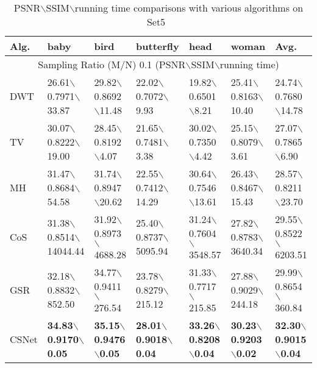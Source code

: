 \documentclass[5pt]{article}
\begin{document}
\begin{table*}[t]\footnotesize
\centering
\caption{\small {PSNR$\backslash$SSIM$\backslash$running time comparisons with various algorithms on Set5~\cite{rf23}}}\label{tab:tab1}
\begin{tabular}{|l|l|l|l|l|l|l|}
\hline 
Alg. & baby & bird & butterfly & head & woman & Avg.\\ 
\hline 
\multicolumn{7}{|c|}{Sampling Ratio (M/N) 0.1 (PSNR$\backslash$SSIM$\backslash$running time)}\\ 
\hline 
DWT & 26.61$\backslash$0.7971$\backslash$33.87 & 29.82$\backslash$0.8692$\backslash$11.48 & 22.02$\backslash$0.7072$\backslash$9.93 & 19.82$\backslash$0.6501$\backslash$8.21 & 25.41$\backslash$0.8163$\backslash$10.40 & 24.74$\backslash$0.7680$\backslash$14.78\\ 
\hline 
TV & 30.07$\backslash$0.8222$\backslash$19.00 & 28.45$\backslash$0.8192$\backslash$4.07 & 21.65$\backslash$0.7481$\backslash$3.38 & 30.02$\backslash$0.7350$\backslash$4.42 & 25.15$\backslash$0.8079$\backslash$3.61 & 27.07$\backslash$0.7865$\backslash$6.90\\ 
\hline 
MH & 31.47$\backslash$0.8684$\backslash$54.58 & 31.74$\backslash$0.8947$\backslash$20.62 & 22.55$\backslash$0.7412$\backslash$14.29 & 30.64$\backslash$0.7546$\backslash$13.61 & 26.43$\backslash$0.8467$\backslash$15.43 & 28.57$\backslash$0.8211$\backslash$23.70\\ 
\hline 
CoS & 31.38$\backslash$0.8514$\backslash$\tiny 14044.44 & 31.92$\backslash$0.8973$\backslash$ \tiny 4688.28 & 25.40$\backslash$0.8737$\backslash$\tiny 5095.94 & 31.24$\backslash$0.7604$\backslash$\tiny 3548.57 & 27.82$\backslash$0.8783$\backslash$\tiny 3640.34 & 29.55$\backslash$0.8522$\backslash$\tiny 6203.51\\ 
\hline 
GSR & 32.18$\backslash$0.8832$\backslash$852.50 & 34.77$\backslash$0.9411$\backslash$276.54 & 23.78$\backslash$0.8279$\backslash$215.12 & 31.33$\backslash$0.7717$\backslash$215.85 & 27.88$\backslash$0.9029$\backslash$244.18 & 29.99$\backslash$0.8654$\backslash$360.84\\ 
\hline 
CSNet & \textbf{34.83}$\backslash$\textbf{0.9170}$\backslash$\textbf{0.05} & \textbf{35.15}$\backslash$\textbf{0.9476}$\backslash$\textbf{0.05} & \textbf{28.01}$\backslash$\textbf{0.9018}$\backslash$\textbf{0.04} & \textbf{33.26}$\backslash$\textbf{0.8208}$\backslash$\textbf{0.04} & \textbf{30.23}$\backslash$\textbf{0.9203}$\backslash$\textbf{0.02} & \textbf{32.30}$\backslash$\textbf{0.9015}$\backslash$\textbf{0.04}\\ 

\end{tabular}
\end{table*}
\end{document}
